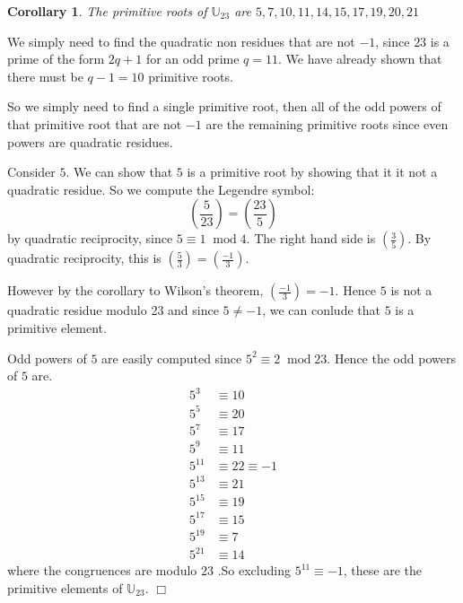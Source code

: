 \documentclass[10pt]{article}
\newtheorem{corollary}[theorem]{Corollary}
\newenvironment{proof}[1][Proof]{\begin{trivlist}
\item[\hskip \labelsep {\bfseries #1}]}{\end{trivlist}}
\newcommand{\modulo}[1]{\;\operatorname{mod} #1}
\newcommand{\legendre}[2]{\left(\frac{#1}{#2}\right)}
\begin{document}
    \begin{corollary}
        The primitive roots of $\mathbb{U}_{23}$
        are $5,7,10,11,14,15,17,19,20,21$
    \end{corollary}
    \begin{proof}
        We simply need to find the quadratic non residues that
        are not $-1$, since $23$ is a prime of the form $2q+1$
        for an odd prime $q = 11$. We have already
        shown that there must be $q-1 = 10$ primitive roots.
        
        So we simply need to find a single primitive root, then
        all of the odd powers of that primitive root
        that are not $-1$ are the remaining primitive roots
        since even powers are quadratic residues.
        
        Consider $5$. We can show that $5$ is a primitive
        root by showing that it it not a quadratic residue.
        So we compute the Legendre symbol:
        \begin{equation*}
            \legendre{5}{23} = \legendre{23}{5}
        \end{equation*} 
        by quadratic reciprocity, since $5\equiv 1\modulo{4}$.
        The right hand side is $\legendre{3}{5}$.
        By quadratic reciprocity, this is $\legendre{5}{3} = \legendre{-1}{3}$.
        
        However by the corollary to Wilson's theorem, $\legendre{-1}{3} = -1$.
        Hence $5$ is not a quadratic residue modulo 23 and since $5\neq -1$,
        we can conlude that $5$ is a primitive element.
        
        Odd powers of $5$ are easily
        computed since $5^2\equiv 2\modulo{23}$. Hence the odd powers of $5$ are.
        \begin{align*}
            5^3 &\equiv 10\\
            5^5 &\equiv 20\\
            5^7 &\equiv 17\\
            5^9 &\equiv 11\\
            5^{11} &\equiv 22\equiv -1\\
            5^{13} &\equiv 21\\
            5^{15} &\equiv 19\\
            5^{17} &\equiv 15\\
            5^{19}&\equiv 7\\
            5^{21}&\equiv 14
        \end{align*}
        where the congruences are modulo $23$ .So excluding $5^{11}\equiv -1$, these are 
        the primitive elements of $\mathbb{U}_{23}$. $\Box$
        
        
    \end{proof}
\end{document}
